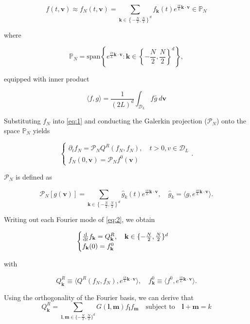 \documentclass{article}
\def\t{\text}
\def\b{\mathbf}
\begin{document}
\[
    f(t,\b v) \approx f_N(t,\b v) = \sum_{\b k \in \left\{-\frac{N}{2}, \frac{N}{2}\right\}^d} f_{\b k}(t) e^{\frac{i \pi}{L} \b k \cdot \b v } \in \mathbb{P}_N
\]

where 

\[
    \mathbb{P}_N = \t{span} \left\{ e^{\frac{i \pi}{L} \b k \cdot \b v } : \b k \in \left\{-\frac{N}{2}, \frac{N}{2}\right\}^d \right\},
\]

equipped with inner product

\[
    \langle f,g \rangle = \frac{1}{(2L)^d} \int_{\mathcal{D}_L} f \bar{g} \: d \b v\]

Substituting $f_N$ into \ref{eq:1} and conducting the Galerkin projection ($\mathcal{P}_N$) onto the space $\mathbb{P}_N$ yields

\begin{equation} \label{eq:2}
    \begin{cases}
        \partial_t f_N = \mathcal{P}_N Q^R(f_N,f_N), \quad t > 0, v\in \mathcal{D}_L\\
        f_N(0,\b v) = \mathcal{P}_N f^0(\b v)
    \end{cases}.
\end{equation}

$\mathcal{P}_N$ is defined as

\[
    \mathcal{P}_N [g(\b v)] = \sum_{\b k \in \left\{-\frac{N}{2}, \frac{N}{2}\right\}^d} \hat{g}_k(t) e^{\frac{i \pi}{L} \b k \cdot \b v }, \quad \hat{g}_k = \langle g, e^{\frac{i \pi}{L} \b k \cdot \b v } \rangle.
\]

Writing out each Fourier mode of \ref{eq:2}, we obtain

\begin{equation}
    \begin{cases}
        \frac{\t d}{\t d t} f_{\b k} = Q^R_{\b k}, \quad \mathbf{k} \in \{-\frac{N}{2}, \frac{N}{2}\}^d\\
        f_{\b k}(0) = f^0_{\mathbf{k}}
    \end{cases}
\end{equation}

with 

\[
    Q^R_{\b k} \equiv \langle Q^R(f_N, f_N), e^{\frac{i \pi}{L} \b k \cdot \b v } \rangle, \quad f^0_{\b k} \equiv \langle f^0, e^{\frac{i \pi}{L} \b k \cdot \b v} \rangle.
\]

Using the orthogonality of the Fourier basis, we can derive that
\begin{equation} \label{eq:QR}
    Q^R_{\b k} = \sum_{\b l,\b m \in \{-\frac{N}{2}, \frac{N}{2}\}^d} G(\b l,\b m) f_{\b l} f_{\b m} \quad \text{subject to} \quad \b l + \b m = k
\end{equation}
\end{document}
